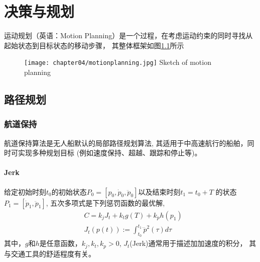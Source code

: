 
\chapter{决策与规划}
\label{chap:chapter04}
运动规划（英语：Motion Planning）是一个过程，在考虑运动约束的同时寻找从起始状态到目标状态的移动步骤， 
其整体框架如图\ref{fig:motionplanning}所示 


\begin{figure}[!htp]
  \centering
  \texttt{[image: chapter04/motionplanning.jpg]}
    {Sketch of motion planning}
  \label{fig:motionplanning}
\end{figure}



\section{路径规划}
\label{sec:pathplanning}

\subsection{航道保持}
航道保持算法是无人船默认的局部路径规划算法, 其适用于中高速航行的船舶，同时可实现多种规划目标
(例如速度保持、超越、跟踪和停止等)。
\subsubsection{Jerk}
\begin{theorem}
\label{thm:jerktheorem}
给定初始时刻$t_0$的初始状态$P_0=[p_0, \dot{p}_0,\ddot{p}_0]$以及结束时刻$t_1= t_0+T$
的状态$P_1=[ \dot{p}_1,\ddot{p}_1]$, 五次多项式是下列惩罚函数的最优解,
\begin{equation}
  \begin{aligned}
    &C=k_j J_t + k_t g(T) + k_p h(p_1) \\
    &J_t(p(t)):=\int_{t_0}^{t_1} \dddot{p}^2(\tau) d \tau
  \end{aligned}
\end{equation}
其中，$g$和$h$是任意函数，$k_j, k_t, k_p>0$, $J_t$(Jerk)通常用于描述加加速度的积分，
其与交通工具的舒适程度有关。
\end{theorem}

